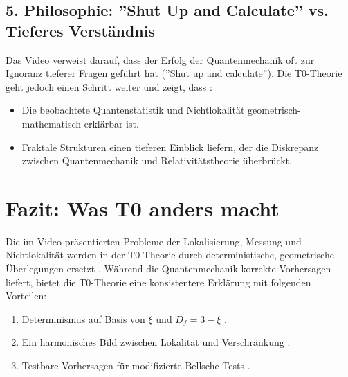 	\subsection*{5. Philosophie: ''Shut Up and Calculate'' vs. Tieferes Verständnis}
	
	Das Video verweist darauf, dass der Erfolg der Quantenmechanik oft zur Ignoranz tieferer Fragen geführt hat (''Shut up and calculate''). Die T0-Theorie geht jedoch einen Schritt weiter und zeigt, dass \cite{NoGoEn}:
	\begin{itemize}
		\item Die beobachtete Quantenstatistik und Nichtlokalität geometrisch-mathematisch erklärbar ist.
		\item Fraktale Strukturen einen tieferen Einblick liefern, der die Diskrepanz zwischen Quantenmechanik und Relativitätstheorie überbrückt.
	\end{itemize}
	
	\section*{Fazit: Was T0 anders macht}
	
	Die im Video \cite{VideoBell2024} präsentierten Probleme der Lokalisierung, Messung und Nichtlokalität werden in der T0-Theorie durch deterministische, geometrische Überlegungen ersetzt \cite{Bell_En}. Während die Quantenmechanik korrekte Vorhersagen liefert, bietet die T0-Theorie eine konsistentere Erklärung mit folgenden Vorteilen:
	
	\begin{enumerate}
		\item Determinismus auf Basis von $\xi$ und $D_f = 3 - \xi$ .
		\item Ein harmonisches Bild zwischen Lokalität und Verschränkung \cite{131_scheinbar_instantan_En}.
		\item Testbare Vorhersagen für modifizierte Bellsche Tests \cite{DynMassePhotonenNichtlokalEn, 023_Bell_En_ch}.
	\end{enumerate}


